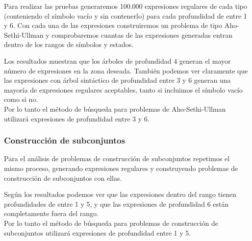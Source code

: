 Para realizar las pruebas generaremos 100.000 expresiones regulares de cada tipo (conteniendo el símbolo vacío y sin contenerlo) para cada profundidad de entre 1 y 6.
Con cada una de las expresiones construiremos un problema de tipo Aho-Sethi-Ullman y comprobaremos cuantas de las expresiones generadas entran dentro de los rangos de símbolos y estados.


Los resultados muestran que los árboles de profundidad 4 generan el mayor número de expresiones en la zona deseada.
También podemos ver claramente que las expresiones con árbol sintáctico de profundidad entre 3 y 6 generan una mayoría de expresiones regulares aceptables, tanto si incluimos el símbolo vacío como si no.
\\
Por lo tanto el método de búsqueda para problemas de Aho-Sethi-Ullman utilizará expresiones de profundidad entre 3 y 6.

\subsubsection{Construcción de subconjuntos}

Para el análisis de problemas de construcción de subconjuntos repetimos el mismo proceso, generando expresiones regulares y construyendo problemas de construcción de subconjuntos con ellas.


Según los resultados podemos ver que las expresiones dentro del rango tienen profundidades de entre 1 y 5, y que las expresiones de profundidad 6 están completamente fuera del rango.
\\
Por lo tanto el método de búsqueda para problemas de construcción de subconjuntos utilizará expresiones de profundidad entre 1 y 5.

